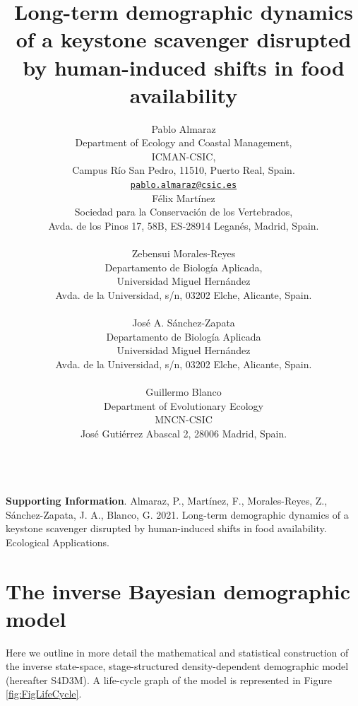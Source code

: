 \documentclass[12pt,a4paper]{article}
\title{Long-term demographic dynamics of a keystone scavenger disrupted by
	human-induced shifts in food availability}
\author{
	Pablo Almaraz
	\\
	Department of Ecology and Coastal Management, \\
	ICMAN-CSIC, \\
	Campus Río San Pedro, 11510, Puerto Real, Spain.\\  \texttt{\href{mailto:pablo.almaraz@csic.es}{\nolinkurl{pablo.almaraz@csic.es}}} \\
	\And
	Félix Martínez
	\\
	Sociedad para la Conservación de los Vertebrados, \\
	Avda. de los Pinos 17, 58B, ES-28914 Leganés, Madrid, Spain. \\
	\texttt{} \\
	\And
	Zebensui Morales-Reyes
	\\
	Departamento de Biología Aplicada, \\
	Universidad Miguel Hernández \\
	Avda. de la Universidad, s/n, 03202 Elche, Alicante, Spain. \\
	\texttt{} \\
	\And
	José A. Sánchez-Zapata
	\\
	Departamento de Biología Aplicada \\
	Universidad Miguel Hernández \\
	Avda. de la Universidad, s/n, 03202 Elche, Alicante, Spain. \\
	\texttt{} \\
	\And
	Guillermo Blanco
	\\
	Department of Evolutionary Ecology \\
	MNCN-CSIC \\
	José Gutiérrez Abascal 2, 28006 Madrid, Spain. \\
	\texttt{} \\
}
\begin{document}
\large{\textbf{Supporting Information}. Almaraz, P., Martínez, F., Morales-Reyes, Z., Sánchez-Zapata, J. A., Blanco, G. 2021. Long-term demographic dynamics of a keystone scavenger disrupted by human-induced shifts in food availability. Ecological Applications.}

\vspace{0.7in}


\tableofcontents


\vspace{0.7in}

\def\tightlist{}

\section{The inverse Bayesian demographic model}

Here we outline in more detail the mathematical and statistical construction of the inverse state-space, stage-structured density-dependent demographic model (hereafter S4D3M). A life-cycle graph of the model is represented in Figure \ref{fig:FigLifeCycle}.\\
\end{document}
